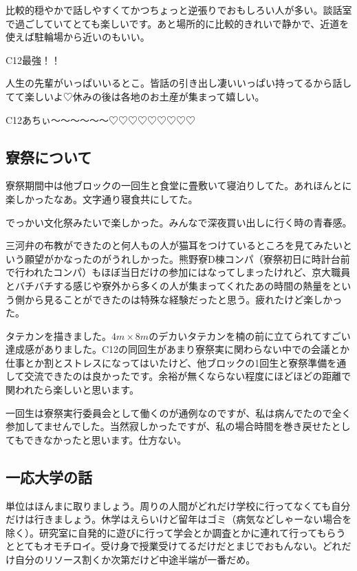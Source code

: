 \begin{multicols}{2}
  比較的穏やかで話しやすくてかつちょっと逆張りでおもしろい人が多い。談話室で過ごしていてとても楽しいです。あと場所的に比較的きれいで静かで、近道を使えば駐輪場から近いのもいい。

  C12最強！！

  人生の先輩がいっぱいいるとこ。皆話の引き出し凄いいっぱい持ってるから話してて楽しいよ♡休みの後は各地のお土産が集まって嬉しい。

  C12あちぃ〜〜〜〜〜〜♡♡♡♡♡♡♡♡♡



  \subsection{寮祭について}

  寮祭期間中は他ブロックの一回生と食堂に畳敷いて寝泊りしてた。あれほんとに楽しかったなあ。文字通り寝食共にしてた。

  でっかい文化祭みたいで楽しかった。みんなで深夜買い出しに行く時の青春感。

  三河弁の布教ができたのと何人もの人が猫耳をつけているところを見てみたいという願望がかなったのがうれしかった。熊野寮D棟コンパ（寮祭初日に時計台前で行われたコンパ）もほぼ当日だけの参加にはなってしまったけれど、京大職員とバチバチする感じや寮外から多くの人が集まってくれたあの時間の熱量をという側から見ることができたのは特殊な経験だったと思う。疲れたけど楽しかった。

  タテカンを描きました。$4m\times8m$のデカいタテカンを楠の前に立てられてすごい達成感がありました。C12の同回生があまり寮祭実に関わらない中での会議とか仕事とか割とストレスになってはいたけど、他ブロックの1回生と寮祭準備を通して交流できたのは良かったです。余裕が無くならない程度にほどほどの距離で関われたら楽しいと思います。

  一回生は寮祭実行委員会として働くのが通例なのですが、私は病んでたので全く参加してませんでした。当然寂しかったですが、私の場合時間を巻き戻せたとしてもできなかったと思います。仕方ない。



  \subsection{一応大学の話}

  単位はほんまに取りましょう。周りの人間がどれだけ学校に行ってなくても自分だけは行きましょう。休学はえらいけど留年はゴミ（病気などしゃーない場合を除く）。研究室に自発的に遊びに行って学会とか調査とかに連れて行ってもらうととてもオモチロイ。受け身で授業受けてるだけだとまじでおもんない。どれだけ自分のリソース割くか次第だけど中途半端が一番だめ。


\end{multicols}
